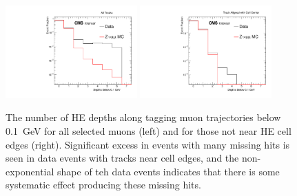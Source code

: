 \begin{figure}[htbp]
	\centering
	\includegraphics[width=0.45\textwidth]{figures/hcalAllMissingHits.pdf}
        \hspace{0.01\textwidth}
        \includegraphics[width=0.45\textwidth]{figures/hcalMissingHits.pdf}
        \caption[Missing muon hits in HE]{The number of HE depths along tagging muon trajectories below \SI{0.1}{\giga\eV} for all selected muons (left) and for those not near HE cell edges (right). Significant excess in events with many missing hits is seen in data events with tracks near cell edges, and the non-exponential shape of teh data events indicates that there is some systematic effect producing these missing hits.}
        \label{fig:missingHits}
\end{figure}

